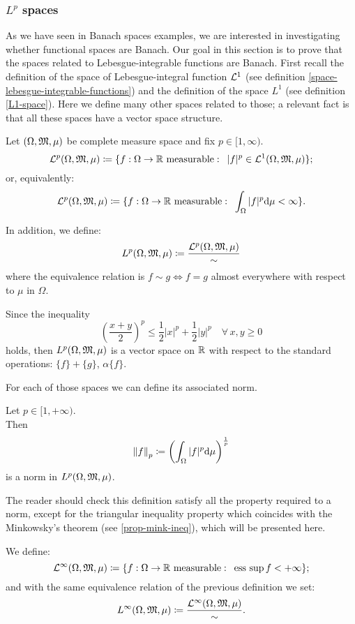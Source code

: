 \subsubsection{\texorpdfstring{$L^p$}{Lp} spaces} \label{chapter-Lp-spaces}
As we have seen in Banach spaces examples, we are interested in investigating whether functional spaces are Banach. Our goal in this section is to prove that the spaces related to Lebesgue-integrable functions are Banach. First recall the definition of the space of Lebesgue-integral function $\mathcal L^1$  (see definition \vref{space-lebesgue-integrable-functions}) and the definition of the space $L^1$ (see definition \vref{L1-space}). Here we define many other spaces related to those; a relevant fact is that all these spaces have a vector space structure.

\begin{defn}
	Let $(\Omega,\mathfrak M,\mu)$ be complete measure space and fix $p \in [1,\infty)$.
	$$
	\mathcal L^p(\Omega, \mathfrak M, \mu) 
	\coloneqq\{
		f:\Omega \to \mathbb R \text{ measurable} :
		\enspace |f|^p \in \mathcal L^1(\Omega, \mathfrak M,\mu)
		\}
	;
	$$
	or, equivalently:
	$$\mathcal L^p(\Omega, \mathfrak M, \mu) \coloneqq\{f:\Omega \to \mathbb R \text{ measurable} : \enspace \int_\Omega |f|^p \mathrm d \mu < \infty\}.$$
	
	In addition, we define:
	$$
	L^p(\Omega,\mathfrak M,\mu)
	\coloneqq\frac{\mathcal L^p(\Omega,\mathfrak M, \mu)}{\sim}
	$$
	where the equivalence relation is $f \sim g \iff f=g$ almost everywhere with respect to  $\mu$ in $\Omega$. 
\end{defn}

Since the inequality 
$$
\left(\frac{x+y}{2} \right)^p 
\leq \frac 1 2 |x|^p + \frac 1 2 |y| ^ p 
\quad \forall	\, x,y 
\geq 0
$$
holds, then $L^p(\Omega,\mathfrak M,\mu)$ is a vector space on $\mathbb R$ with respect to the standard operations: $\{f\}+\{g\}$, $\alpha\{f\}$.

For each of those spaces we can define its associated norm.
\begin{defn}
	Let $p\in[1, +\infty)$. \\
	Then 
	$$
	\left\lVert f\right\rVert_p 
	\coloneqq\left(\int_\Omega |f|^p \mathrm d \mu \right)^{\frac 1 p}
	$$ 
	is a norm in $L^p(\Omega, \mathfrak M, \mu)$.
\end{defn}
The reader should check this definition satisfy all the property required to a norm, except for the triangular inequality property which coincides with the Minkowsky's theorem (see \vref{prop-mink-ineq}), which will be presented here.

\begin{defn}
	We define:
	$$
		\mathcal L^\infty(\Omega, \mathfrak M, \mu) 
		\coloneqq\{f:\Omega \to \mathbb R \text{ measurable} : \enspace \operatorname*{ess\ sup} f < +\infty\}
	;
	$$
	and with the same equivalence relation of the previous definition we set:
	$$
		L^\infty(\Omega,\mathfrak M,\mu) 
		\coloneqq\frac{\mathcal L^\infty(\Omega,\mathfrak M, \mu)}{\sim}
	.
	$$
\end{defn}

